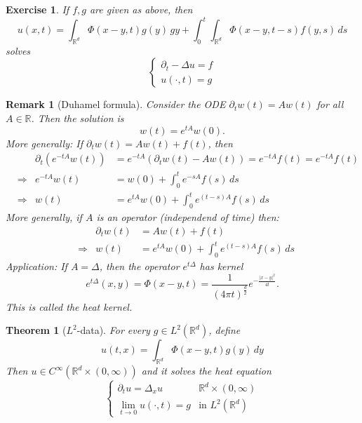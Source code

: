 \documentclass{report}
\theoremstyle{tommy}
\newtheorem{thm}[defn]{Theorem}
\newtheorem{rem}[defn]{Remark}
\newtheorem{ex}[defn]{Exercise}
\begin{document}
  \begin{ex}
    If \(f,g\) are given as above, then 
    \[u(x,t) = \int_{\mathbb{R}^d} \Phi(x-y,t) g(y) \, gy + \int_0^t \int_{\mathbb{R}^d} \Phi(x-y,t-s) f(y,s) \, ds\]
  solves
  \[\begin{cases}
    \partial_t - \Delta u = f \\ u(\cdot, t) = g
  \end{cases}\]
\end{ex}

\begin{rem}[Duhamel formula]
  Consider the ODE \(\partial_t w(t) = Aw(t)\) for all \(A \in \mathbb{R}\). Then the solution is
  \[w(t) = e^{tA} w(0).\]
  More generally: If \(\partial_t w(t) = Aw(t) + f(t)\), then
  \begin{align*}
    &&\partial_t(e^{-tA} w(t)) &= e^{-tA}(\partial_tw(t) - Aw(t)) = e^{-tA}f(t) = e^{-tA} f(t) \\
    &\Rightarrow &e^{-tA} w(t) &= w(0) + \int_0^t e^{-sA} f(s) \, ds \\
    &\Rightarrow &w(t) &= e^{tA} w(0) + \int_0^t e^{(t-s)A}f(s) \, ds
  \end{align*}
  More generally, if \(A\) is an operator (independend of time) then:
 \begin{align*}
   &&\partial_tw(t) &= Aw(t) + f(t) \\
   &\Rightarrow &w(t) &= e^{tA} w(0) + \int_0^t e^{(t-s)A} f(s) \, ds
 \end{align*}
 Application: If \(A = \Delta\), then the operator \(e^{t\Delta}\) has kernel
 \[e^{t\Delta}(x,y) = \Phi(x-y,t) = \frac{1}{(4 \pi t)^{\frac{d}{2}}}e^{-\frac{|x-y|^2}{4t}}.\]
 This is called the \emph{heat kernel}.
\end{rem}

\begin{thm}[\(L^2\)-data]
  For every \(g \in L^2(\mathbb{R}^d)\), define 
  \[u(t,x) = \int_{\mathbb{R}^d} \Phi(x-y,t)g(y) \, dy\]
  Then \(u \in C^\infty(\mathbb{R}^d \times (0,\infty))\) and it solves the heat equation
  \[\begin{cases}
    \partial_t u = \Delta_x u & \mathbb{R}^d \times (0,\infty) \\
    \lim_{t \to 0} u(\cdot, t) = g &\text{in } L^2(\mathbb{R}^d)
  \end{cases}\]
\end{thm}
\end{document}
